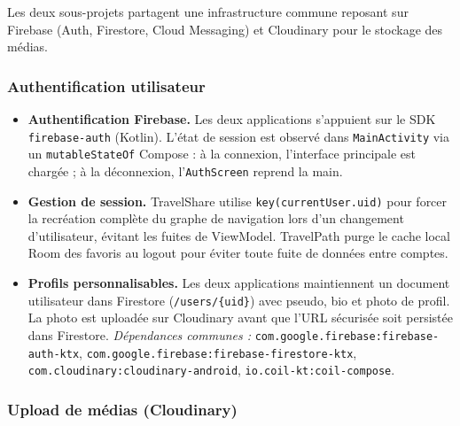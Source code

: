\documentclass[a4paper, 12pt]{article}
\begin{document}
\begin{justify}
Les deux sous-projets partagent une infrastructure commune reposant sur Firebase (Auth, Firestore, Cloud Messaging) et Cloudinary pour le stockage des médias.

\subsubsection*{Authentification utilisateur}

\begin{itemize}

    \item \textbf{Authentification Firebase.}
    Les deux applications s'appuient sur le SDK \texttt{firebase-auth} (Kotlin). L'état de session est observé dans \texttt{MainActivity} via un \texttt{mutableStateOf} Compose : à la connexion, l'interface principale est chargée ; à la déconnexion, l'\texttt{AuthScreen} reprend la main.

    \item \textbf{Gestion de session.}
    TravelShare utilise \texttt{key(currentUser.\allowbreak{}uid)} pour forcer la recréation complète du graphe de navigation lors d'un changement d'utilisateur, évitant les fuites de ViewModel. TravelPath purge le cache local Room des favoris au logout pour éviter toute fuite de données entre comptes.

    \item \textbf{Profils personnalisables.}
    Les deux applications maintiennent un document utilisateur dans Firestore (\texttt{/\allowbreak{}users/\allowbreak{}\{uid\}}) avec pseudo, bio et photo de profil. La photo est uploadée sur Cloudinary avant que l'URL sécurisée soit persistée dans Firestore.
    \newline\textit{Dépendances communes :} \texttt{com.\allowbreak{}google.\allowbreak{}firebase:\allowbreak{}firebase-auth-ktx}, \texttt{com.\allowbreak{}google.\allowbreak{}firebase:\allowbreak{}firebase-firestore-ktx}, \texttt{com.\allowbreak{}cloudinary:\allowbreak{}cloudinary-android}, \texttt{io.\allowbreak{}coil-kt:\allowbreak{}coil-compose}.

\end{itemize}

\subsubsection*{Upload de médias (Cloudinary)}

\begin{itemize}


\end{itemize}
\end{justify}
\end{document}
